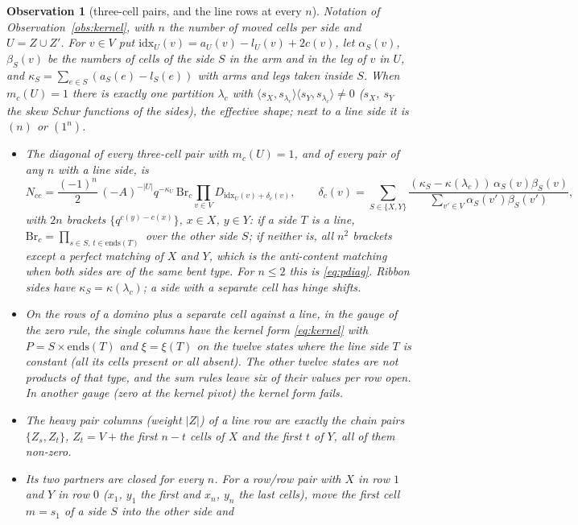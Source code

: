 \documentclass[11pt]{article}
\newtheorem{observation}{Observation}
\begin{document}
\begin{observation}[three-cell pairs, and the line rows at every $n$]\label{obs:threecell}
Notation of Observation~\ref{obs:kernel}, with $n$ the number of moved cells per side and $U=Z\cup Z'$.  For $v\in V$ put
$\mathrm{idx}_U(v)=a_U(v)-l_U(v)+2c(v)$, let $\alpha_S(v)$, $\beta_S(v)$ be the numbers of cells of the side $S$ in the arm
and in the leg of $v$ in $U$, and $\kappa_S=\sum_{e\in S}(a_S(e)-l_S(e))$ with arms and legs taken inside $S$.  When
$m_c(U)=1$ there is exactly one partition $\lambda_c$ with $\langle s_X,s_{\lambda_c}\rangle\langle
s_Y,s_{\lambda_c}\rangle\ne0$ ($s_X$, $s_Y$ the skew Schur functions of the sides), the \emph{effective shape}; next to a
line side it is $(n)$ or $(1^n)$.
\begin{itemize}
\item[(D3)] The diagonal of every three-cell pair with $m_c(U)=1$, and of every pair of any $n$ with a line side, is
\[
N_{cc}=\frac{(-1)^n}2\,(-A)^{-|U|}q^{-\kappa_U}\,\mathrm{Br}_c\prod_{v\in V}D_{\mathrm{idx}_U(v)+\delta_c(v)},\qquad
\delta_c(v)=\sum_{S\in\{X,Y\}}\frac{(\kappa_S-\kappa(\lambda_c))\,\alpha_S(v)\beta_S(v)}{\sum_{v'\in V}\alpha_S(v')\beta_S(v')},
\]
with $2n$ brackets $\{q^{c(y)-c(x)}\}$, $x\in X$, $y\in Y$: if a side $T$ is a line,
$\mathrm{Br}_c=\prod_{s\in S,\,t\in\mathrm{ends}(T)}$ over the other side $S$; if neither is, all $n^2$ brackets except a
perfect matching of $X$ and $Y$, which is the anti-content matching when both sides are of the same bent type.  For
$n\le2$ this is \eqref{eq:pdiag}.  Ribbon sides have $\kappa_S=\kappa(\lambda_c)$; a side with a separate cell has hinge
shifts.
\item[(LE)] On the rows of a domino plus a separate cell against a line, in the gauge of the zero rule, the single columns
have the kernel form \eqref{eq:kernel} with $P=S\times\mathrm{ends}(T)$ and $\xi=\xi(T)$ on the twelve states where the line
side $T$ is constant (all its cells present or all absent).  The other twelve states are not products of that type, and the
sum rules leave six of their values per row open.  In another gauge (zero at the kernel pivot) the kernel form fails.
\item[(LC)] The heavy pair columns (weight $|Z|$) of a line row are exactly the chain pairs $\{Z_s,Z_t\}$,
$Z_t=V+{}$the first $n-t$ cells of $X$ and the first $t$ of $Y$, all of them non-zero.
\item[(LP)] Its two partners are closed for every $n$.  For a row/row pair with $X$ in row $1$ and $Y$ in row $0$ ($x_1$,
$y_1$ the first and $x_n$, $y_n$ the last cells), move the first cell $m=s_1$ of a side $S$ into the other side and

\end{itemize}
\end{observation}
\end{document}
